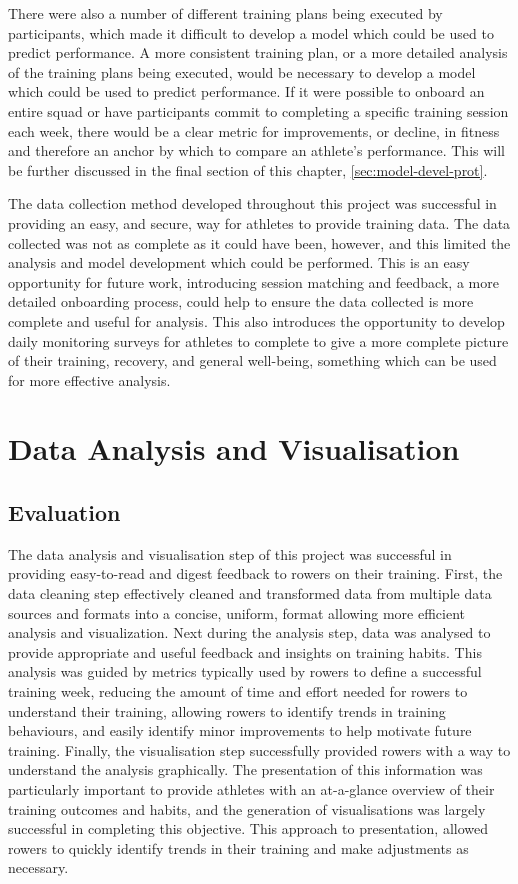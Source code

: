 There were also a number of different training plans being executed by participants, which made it difficult to develop a model which could be used to predict performance. A more consistent training plan, or a more detailed analysis of the training plans being executed, would be necessary to develop a model which could be used to predict performance. If it were possible to onboard an entire squad or have participants commit to completing a specific training session each week, there would be a clear metric for improvements, or decline, in fitness and therefore an anchor by which to compare an athlete's performance. This will be further discussed in the final section of this chapter, \autoref{sec:model-devel-prot}.

The data collection method developed throughout this project was successful in providing an easy, and secure, way for athletes to provide training data. The data collected was not as complete as it could have been, however, and this limited the analysis and model development which could be performed. This is an easy opportunity for future work, introducing session matching and feedback, a more detailed onboarding process, could help to ensure the data collected is more complete and useful for analysis. This also introduces the opportunity to develop daily monitoring surveys for athletes to complete to give a more complete picture of their training, recovery, and general well-being, something which can be used for more effective analysis.

\section{\label{sec:data-anyl-diss}Data Analysis and Visualisation}
\subsection{Evaluation}
The data analysis and visualisation step of this project was successful in providing easy-to-read and digest feedback to rowers on their training. First, the data cleaning step effectively cleaned and transformed data from multiple data sources and formats into a concise, uniform, format allowing more efficient analysis and visualization. Next during the analysis step, data was analysed to provide appropriate and useful feedback and insights on training habits. This analysis was guided by metrics typically used by rowers to define a successful training week, reducing the amount of time and effort needed for rowers to understand their training, allowing rowers to identify trends in training behaviours, and easily identify minor improvements to help motivate future training. Finally, the visualisation step successfully provided rowers with a way to understand the analysis graphically. The presentation of this information was particularly important to provide athletes with an at-a-glance overview of their training outcomes and habits, and the generation of visualisations was largely successful in completing this objective. This approach to presentation, allowed rowers to quickly identify trends in their training and make adjustments as necessary.

